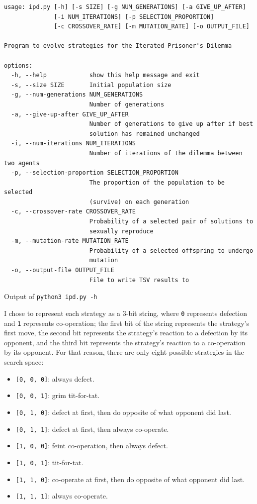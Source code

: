 \documentclass[a4paper]{article}
\newenvironment{code}{\captionsetup{type=listing}}{}
\begin{document}
\begin{code}
\begin{verbatim}
usage: ipd.py [-h] [-s SIZE] [-g NUM_GENERATIONS] [-a GIVE_UP_AFTER]
              [-i NUM_ITERATIONS] [-p SELECTION_PROPORTION]
              [-c CROSSOVER_RATE] [-m MUTATION_RATE] [-o OUTPUT_FILE]

Program to evolve strategies for the Iterated Prisoner's Dilemma

options:
  -h, --help            show this help message and exit
  -s, --size SIZE       Initial population size
  -g, --num-generations NUM_GENERATIONS
                        Number of generations
  -a, --give-up-after GIVE_UP_AFTER
                        Number of generations to give up after if best
                        solution has remained unchanged
  -i, --num-iterations NUM_ITERATIONS
                        Number of iterations of the dilemma between two agents
  -p, --selection-proportion SELECTION_PROPORTION
                        The proportion of the population to be selected
                        (survive) on each generation
  -c, --crossover-rate CROSSOVER_RATE
                        Probability of a selected pair of solutions to
                        sexually reproduce
  -m, --mutation-rate MUTATION_RATE
                        Probability of a selected offspring to undergo
                        mutation
  -o, --output-file OUTPUT_FILE
                        File to write TSV results to
\end{verbatim}
\caption{Output of \texttt{python3 ipd.py -h}}
\end{code}

I chose to represent each strategy as a 3-bit string, where \verb|0| represents defection and \verb|1| represents co-operation;
the first bit of the string represents the strategy's first move, the second bit represents the strategy's reaction to a defection by its opponent, and the third bit represents the strategy's reaction to a co-operation by its opponent.
For that reason, there are only eight possible strategies in the search space:
\begin{itemize}
    \item   \verb|[0, 0, 0]|:   always defect.
    \item   \verb|[0, 0, 1]|:   grim tit-for-tat.
    \item   \verb|[0, 1, 0]|:   defect at first, then do opposite of what opponent did last.
    \item   \verb|[0, 1, 1]|:   defect at first, then always co-operate.
    \item   \verb|[1, 0, 0]|:   feint co-operation, then always defect.
    \item   \verb|[1, 0, 1]|:   tit-for-tat.
    \item   \verb|[1, 1, 0]|:   co-operate at first, then do opposite of what opponent did last.
    \item   \verb|[1, 1, 1]|:   always co-operate.
\end{itemize}
\end{document}
